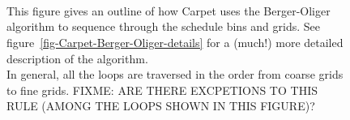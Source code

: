 \documentclass{article}
\def\thorn#1{\textbf{#1}}
\begin{document}
\begin{figure}[bp]
\begin{center}
\\
\\
\\
\end{center}
\caption[Summary of the \thorn{Carpet} schedule]
	{
	This figure gives an outline of how Carpet uses the
	Berger-Oliger algorithm to sequence through the
	schedule bins and grids.
	See figure~\protect\ref{fig-Carpet-Berger-Oliger-details}
	for a (much!) more detailed description of the algorithm.	\\
	In general, all the loops are traversed in the order
	from coarse grids to fine grids.
	FIXME: ARE THERE EXCPETIONS TO THIS RULE
	(AMONG THE LOOPS SHOWN IN THIS FIGURE)?
	}
\label{fig-Carpet-Berger-Oliger-summary}
\end{figure}
\end{document}
